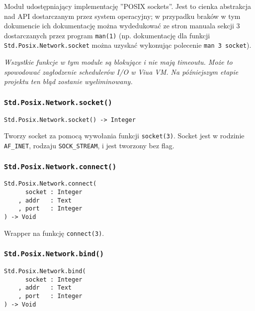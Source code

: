 Moduł udostępniający implementację ''POSIX sockets''. Jest to cienka abstrakcja nad API dostarczanym przez
system operacyjny; w przypadku braków w tym dokumencie ich dokumentację można wydedukować ze stron manuala
sekcji 3 dostarczanych przez program \texttt{man(1)} (np. dokumentację dla funkcji
\texttt{Std.Posix.Network.socket} można uzyskać wykonując polecenie \texttt{man 3 socket}).

\begin{center}
\emph{Wszystkie funkcje w tym module są blokujące i nie mają timeoutu. Może to spowodować zagłodzenie
schedulerów I/O w Viua VM. Na późniejszym etapie projektu ten błąd zostanie wyeliminowany.}
\end{center}

\subsubsection{\texttt{Std.Posix.Network.socket()}}

\begin{small}
\begin{lstlisting}
Std.Posix.Network.socket() -> Integer
\end{lstlisting}
\end{small}

Tworzy socket za pomocą wywołania funkcji \texttt{socket(3)}.
Socket jest w rodzinie \texttt{AF\_INET}, rodzaju \texttt{SOCK\_STREAM}, i jest tworzony bez flag.

\subsubsection{\texttt{Std.Posix.Network.connect()}}

\begin{small}
\begin{lstlisting}
Std.Posix.Network.connect(
      socket : Integer
    , addr   : Text
    , port   : Integer
) -> Void
\end{lstlisting}
\end{small}

Wrapper na funkcję \texttt{connect(3)}.

\subsubsection{\texttt{Std.Posix.Network.bind()}}

\begin{small}
\begin{lstlisting}
Std.Posix.Network.bind(
      socket : Integer
    , addr   : Text
    , port   : Integer
) -> Void
\end{lstlisting}
\end{small}

